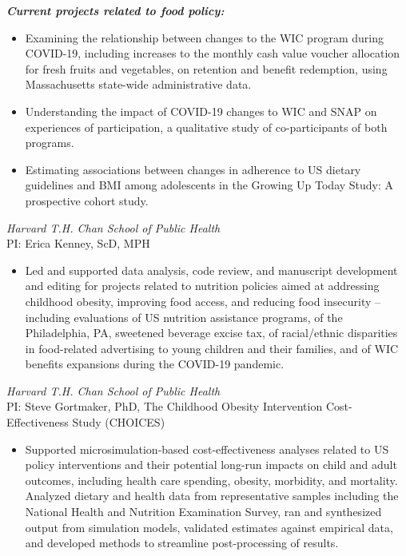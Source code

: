 \documentclass{cv_style}
\begin{document}
\vspace{1em}
\textit{\textbf{Current projects related to food policy:}}
\begin{itemize}
    \item Examining the relationship between changes to the WIC program during COVID-19, including increases to the monthly cash value voucher allocation for fresh fruits and vegetables, on retention and benefit redemption, using Massachusetts state-wide administrative data. \parskip 1pt
    \item Understanding the impact of COVID-19 changes to WIC and SNAP on experiences of participation, a qualitative study of co-participants of both programs. \parskip 1pt
    \item Estimating associations between changes in adherence to US dietary guidelines and BMI among adolescents in the Growing Up Today Study: A prospective cohort study.
\end{itemize}

\textit{Harvard T.H. Chan School of Public Health} \\
PI: Erica Kenney, ScD, MPH
\begin{itemize}
    \item Led and supported data analysis, code review, and manuscript development and editing for projects related to nutrition policies aimed at addressing childhood obesity, improving food access, and reducing food insecurity -- including evaluations of US nutrition assistance programs, of the Philadelphia, PA, sweetened beverage excise tax, of racial/ethnic disparities in food-related advertising to young children and their families, and of WIC benefits expansions during the COVID-19 pandemic.
\end{itemize}

\textit{Harvard T.H. Chan School of Public Health} \\
PI: Steve Gortmaker, PhD, The Childhood Obesity Intervention Cost-Effectiveness Study (CHOICES)
\begin{itemize}
    \item Supported microsimulation-based cost-effectiveness analyses related to US policy interventions and their potential long-run impacts on child and adult outcomes, including health care spending, obesity, morbidity, and mortality. Analyzed dietary and health data from representative samples including the National Health and Nutrition Examination Survey, ran and synthesized output from simulation models, validated estimates against empirical data, and developed methods to streamline post-processing of results.
\end{itemize}
\end{document}
